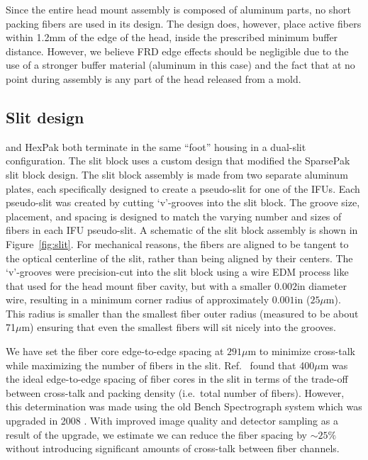 Since the entire \GP head mount assembly is composed of aluminum parts, no
short packing fibers are used in its design.  The design does, however, place
active fibers within 1.2mm of the edge of the head, inside the prescribed
minimum buffer distance.  However, we believe FRD edge effects should be
negligible due to the use of a stronger buffer material (aluminum in this
case) and the fact that at no point during assembly is any part of the \GP
head released from a mold.


\subsection{Slit design} 
\label{GPBsub:sec:slit}

\GP and HexPak both terminate in the same ``foot'' housing in a dual-slit
configuration.  The slit block uses a custom design that modified the
SparsePak slit block design.  The slit block assembly is made from two
separate aluminum plates, each specifically designed to create a pseudo-slit
for one of the IFUs.  Each pseudo-slit was created by cutting `v'-grooves into
the slit block.  The groove size, placement, and spacing is designed to match
the varying number and sizes of fibers in each IFU pseudo-slit.  A schematic
of the slit block assembly is shown in Figure~\ref{fig:slit}.  For mechanical
reasons, the fibers are aligned to be tangent to the optical centerline of the
slit, rather than being aligned by their centers.  The `v'-grooves were
precision-cut into the slit block using a wire EDM process like that used for
the \GP head mount fiber cavity, but with a smaller $0.002$in diameter
wire, resulting in a minimum corner radius of approximately $0.001$in
($25\mu$m).  This radius is smaller than the smallest fiber outer radius
(measured to be about 71$\mu$m) ensuring that even the smallest fibers will
sit nicely into the grooves.


We have set the fiber core edge-to-edge spacing at $291\mu$m to minimize
cross-talk while maximizing the number of fibers in the slit.
Ref.~ found that 400$\mu$m was the ideal edge-to-edge
spacing of fiber cores in the slit in terms of the trade-off between
cross-talk and packing density (i.e.\ total number of fibers).  However, this
determination was made using the old Bench Spectrograph system which was
upgraded in 2008 \citep{Bershady08}.  With improved image quality and detector
sampling as a result of the upgrade, we estimate we can reduce the fiber
spacing by $\sim25\%$ without introducing significant amounts of cross-talk
between fiber channels.


